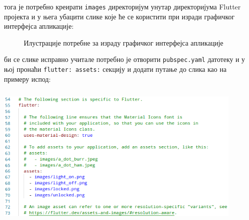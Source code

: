 \documentclass[12pt]{article}
\begin{document}
\indent{} тога је потребно креирати \texttt{images} директоријум унутар директоријума Flutter пројекта и у њега убацити слике које ће се користити при изради графичког интерфејса апликације:
\begin{figure}[H]
\centering
{}
\hfill %
\hfill %
\hfill %
\vspace{0.3cm}
\caption{Илустрације потребне за израду графичког интерфејса апликације}
\end{figure}
 би се слике исправно учитале потребно је отворити \texttt{pubspec.yaml} датотеку и у њој пронаћи \texttt{flutter: assets:} секцију и додати путање до слика као на примеру испод:
\begin{center}
    \centering 
    \includegraphics[height=7cm, width=12cm]{images/assets}
\end{center}
\end{document}
